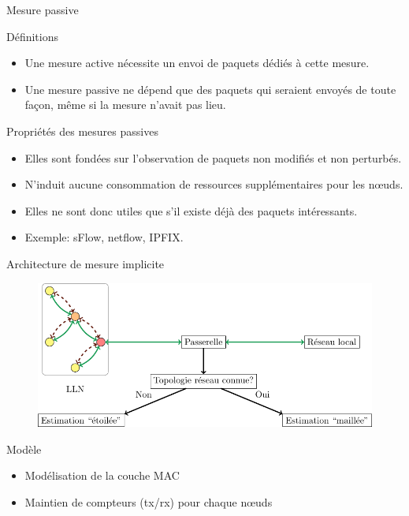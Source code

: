 \begin{frame}{Mesure passive}
  \begin{block}{Définitions}
    \begin{itemize}
      \item Une mesure active nécessite un envoi de paquets dédiés à cette mesure.
      \item Une mesure passive ne dépend que des paquets qui seraient envoyés de toute façon, même si la mesure n'avait pas lieu.
    \end{itemize}
  \end{block}
  \begin{block}{Propriétés des mesures passives}
    \begin{itemize}
      \item Elles sont fondées sur l'observation de paquets non modifiés et non perturbés.
      \item N'induit aucune consommation de ressources supplémentaires pour les nœuds.
      \item Elles ne sont donc utiles que s'il existe déjà des paquets intéressants.
      \item Exemple: sFlow, netflow, IPFIX.
    \end{itemize}

  \end{block}

\end{frame}

\begin{frame}{Architecture de mesure implicite}
  \begin{figure}
    \centering
    \includegraphics[width=\textwidth]{figures/schema_supervision_slides.pdf}
  \end{figure}
  \begin{block}{Modèle}
    \begin{itemize}
      \item Modélisation de la couche MAC
      \item Maintien de compteurs (tx/rx) pour chaque nœuds
    \end{itemize}
  \end{block}
\end{frame}

